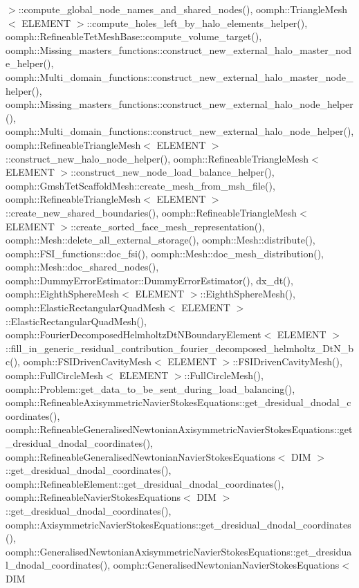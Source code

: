 $>$\+::compute\+\_\+global\+\_\+node\+\_\+names\+\_\+and\+\_\+shared\+\_\+nodes(), oomph\+::\+Triangle\+Mesh$<$ E\+L\+E\+M\+E\+N\+T $>$\+::compute\+\_\+holes\+\_\+left\+\_\+by\+\_\+halo\+\_\+elements\+\_\+helper(), oomph\+::\+Refineable\+Tet\+Mesh\+Base\+::compute\+\_\+volume\+\_\+target(), oomph\+::\+Missing\+\_\+masters\+\_\+functions\+::construct\+\_\+new\+\_\+external\+\_\+halo\+\_\+master\+\_\+node\+\_\+helper(), oomph\+::\+Multi\+\_\+domain\+\_\+functions\+::construct\+\_\+new\+\_\+external\+\_\+halo\+\_\+master\+\_\+node\+\_\+helper(), oomph\+::\+Missing\+\_\+masters\+\_\+functions\+::construct\+\_\+new\+\_\+external\+\_\+halo\+\_\+node\+\_\+helper(), oomph\+::\+Multi\+\_\+domain\+\_\+functions\+::construct\+\_\+new\+\_\+external\+\_\+halo\+\_\+node\+\_\+helper(), oomph\+::\+Refineable\+Triangle\+Mesh$<$ E\+L\+E\+M\+E\+N\+T $>$\+::construct\+\_\+new\+\_\+halo\+\_\+node\+\_\+helper(), oomph\+::\+Refineable\+Triangle\+Mesh$<$ E\+L\+E\+M\+E\+N\+T $>$\+::construct\+\_\+new\+\_\+node\+\_\+load\+\_\+balance\+\_\+helper(), oomph\+::\+Gmsh\+Tet\+Scaffold\+Mesh\+::create\+\_\+mesh\+\_\+from\+\_\+msh\+\_\+file(), oomph\+::\+Refineable\+Triangle\+Mesh$<$ E\+L\+E\+M\+E\+N\+T $>$\+::create\+\_\+new\+\_\+shared\+\_\+boundaries(), oomph\+::\+Refineable\+Triangle\+Mesh$<$ E\+L\+E\+M\+E\+N\+T $>$\+::create\+\_\+sorted\+\_\+face\+\_\+mesh\+\_\+representation(), oomph\+::\+Mesh\+::delete\+\_\+all\+\_\+external\+\_\+storage(), oomph\+::\+Mesh\+::distribute(), oomph\+::\+F\+S\+I\+\_\+functions\+::doc\+\_\+fsi(), oomph\+::\+Mesh\+::doc\+\_\+mesh\+\_\+distribution(), oomph\+::\+Mesh\+::doc\+\_\+shared\+\_\+nodes(), oomph\+::\+Dummy\+Error\+Estimator\+::\+Dummy\+Error\+Estimator(), dx\+\_\+dt(), oomph\+::\+Eighth\+Sphere\+Mesh$<$ E\+L\+E\+M\+E\+N\+T $>$\+::\+Eighth\+Sphere\+Mesh(), oomph\+::\+Elastic\+Rectangular\+Quad\+Mesh$<$ E\+L\+E\+M\+E\+N\+T $>$\+::\+Elastic\+Rectangular\+Quad\+Mesh(), oomph\+::\+Fourier\+Decomposed\+Helmholtz\+Dt\+N\+Boundary\+Element$<$ E\+L\+E\+M\+E\+N\+T $>$\+::fill\+\_\+in\+\_\+generic\+\_\+residual\+\_\+contribution\+\_\+fourier\+\_\+decomposed\+\_\+helmholtz\+\_\+\+Dt\+N\+\_\+bc(), oomph\+::\+F\+S\+I\+Driven\+Cavity\+Mesh$<$ E\+L\+E\+M\+E\+N\+T $>$\+::\+F\+S\+I\+Driven\+Cavity\+Mesh(), oomph\+::\+Full\+Circle\+Mesh$<$ E\+L\+E\+M\+E\+N\+T $>$\+::\+Full\+Circle\+Mesh(), oomph\+::\+Problem\+::get\+\_\+data\+\_\+to\+\_\+be\+\_\+sent\+\_\+during\+\_\+load\+\_\+balancing(), oomph\+::\+Refineable\+Axisymmetric\+Navier\+Stokes\+Equations\+::get\+\_\+dresidual\+\_\+dnodal\+\_\+coordinates(), oomph\+::\+Refineable\+Generalised\+Newtonian\+Axisymmetric\+Navier\+Stokes\+Equations\+::get\+\_\+dresidual\+\_\+dnodal\+\_\+coordinates(), oomph\+::\+Refineable\+Generalised\+Newtonian\+Navier\+Stokes\+Equations$<$ D\+I\+M $>$\+::get\+\_\+dresidual\+\_\+dnodal\+\_\+coordinates(), oomph\+::\+Refineable\+Element\+::get\+\_\+dresidual\+\_\+dnodal\+\_\+coordinates(), oomph\+::\+Refineable\+Navier\+Stokes\+Equations$<$ D\+I\+M $>$\+::get\+\_\+dresidual\+\_\+dnodal\+\_\+coordinates(), oomph\+::\+Axisymmetric\+Navier\+Stokes\+Equations\+::get\+\_\+dresidual\+\_\+dnodal\+\_\+coordinates(), oomph\+::\+Generalised\+Newtonian\+Axisymmetric\+Navier\+Stokes\+Equations\+::get\+\_\+dresidual\+\_\+dnodal\+\_\+coordinates(), oomph\+::\+Generalised\+Newtonian\+Navier\+Stokes\+Equations$<$ D\+I\+M 